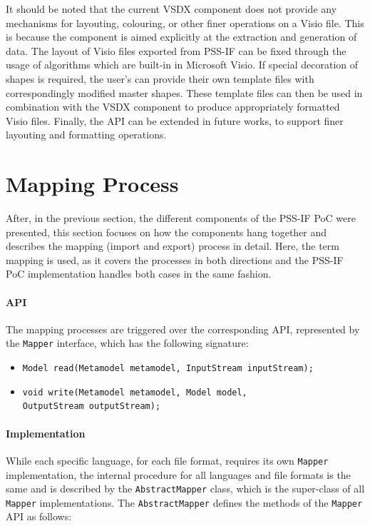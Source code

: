 It should be noted that the current VSDX component does not provide any mechanisms for layouting, colouring, or other finer operations on a Visio file. This is because the component is aimed explicitly at the extraction and generation of data. The layout of Visio files exported from PSS-IF can be fixed through the usage of algorithms which are built-in in Microsoft Visio. If special decoration of shapes is required, the user's can provide their own template files with correspondingly modified master shapes. These template files can then be used in combination with the VSDX component to produce appropriately formatted Visio files. Finally, the API can be extended in future works, to support finer layouting and formatting operations.

\section{Mapping Process}
\label{sec:impl:process}

After, in the previous section, the different components of the PSS-IF PoC were presented, this section focuses on how the components hang together and describes the mapping (import and export) process in detail. Here, the term mapping is used, as it covers the processes in both directions and the PSS-IF PoC implementation handles both cases in the same fashion.

\paragraph{API} The mapping processes are triggered over the corresponding API, represented by the \texttt{Mapper} interface, which has the following signature:

\begin{itemize}
\item \texttt{Model read(Metamodel metamodel, InputStream inputStream);}
\item \texttt{void write(Metamodel metamodel, Model model,}\\ \texttt{OutputStream outputStream);}
\end{itemize}

\paragraph{Implementation} While each specific language, for each file format, requires its own \texttt{Mapper} implementation, the internal procedure for all languages and file formats is the same and is described by the \texttt{AbstractMapper} class, which is the super-class of all \texttt{Mapper} implementations. The \texttt{AbstractMapper} defines the methods of the \texttt{Mapper} API as follows:

